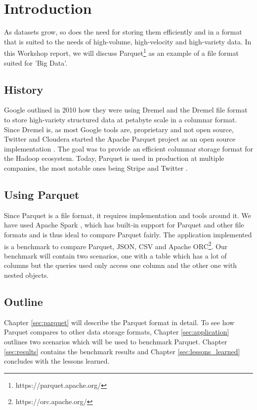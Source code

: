 \section{Introduction} \label{sec:introduction}

As datasets grow, so does the need for storing them efficiently and in a format that is suited to the needs of high-volume, high-velocity and high-variety data.
In this Workshop report, we will discuss Parquet\footnote{https://parquet.apache.org/} as an example of a file format suited for 'Big Data'.

\subsection{History}
Google outlined in 2010 how they were using Dremel \cite{dremel:melnik} and the Dremel file format to store high-variety structured data at petabyte scale in a columnar format.
Since Dremel is, as most Google tools are, proprietary and not open source,
Twitter and Cloudera started the Apache Parquet project as an open source implementation \cite{parquet-announcement:kestelyn}.
The goal was to provide an efficient columnar storage format for the Hadoop ecosystem.
Today, Parquet is used in production at multiple companies, the most notable ones being Stripe and Twitter \cite{adopters:parquet}.

\subsection{Using Parquet}
Since Parquet is a file format, it requires implementation and tools around it.
We have used Apache Spark \cite{spark:zaharia}, which has built-in support for Parquet and other file formats and is thus ideal to compare Parquet fairly.
The application implemented is a benchmark to compare Parquet, JSON, CSV and Apache ORC\footnote{https://orc.apache.org/}.
Our benchmark will contain two scenarios, one with a table which has a lot of columns but the queries used only access one column and the other one with nested objects.

\subsection{Outline}
Chapter \ref{sec:parquet} will describe the Parquet format in detail.
To see how Parquet compares to other data storage formats, Chapter \ref{sec:application} outlines two scenarios which will be used to benchmark Parquet.
Chapter \ref{sec:results} contains the benchmark results and Chapter \ref{sec:lessons_learned} concludes with the lessons learned.
